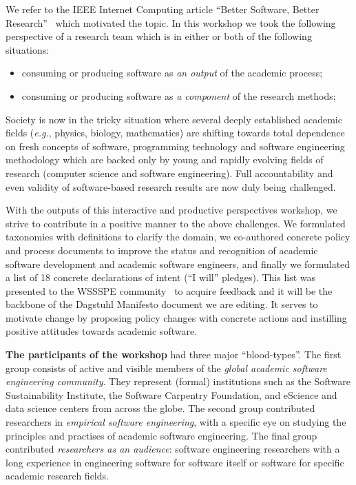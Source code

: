 \documentclass[a4paper,UKenglish]{dagrep}
\newcommand{\eg}{\emph{e.g.},\xspace}
\begin{document}
We refer to the IEEE Internet Computing article ``Better Software, Better Research''~\cite{Goble2014} which motivated the topic. In this workshop we took the following perspective of a research team which is in either or both of the following situations:
\begin{itemize}
\item consuming or producing software as \emph{an output} of the academic process;
\item consuming or producing software as \emph{a component} of the research methods;
\end{itemize}

Society is now in the tricky situation where several deeply established academic fields
(\eg physics, biology, mathematics) are shifting towards total dependence on fresh concepts of software, programming technology and software engineering methodology
which are backed only by young and rapidly evolving fields of research (computer science and software engineering).  Full accountability and even validity of software-based research results are now duly being challenged.

With the outputs of this interactive and productive perspectives workshop, we strive to contribute in a positive manner to the above challenges. We formulated taxonomies with definitions to clarify the domain, we co-authored concrete policy and process documents to improve the status and recognition of academic software development and academic software engineers, and finally we formulated a list of 18 concrete declarations of intent (``I will'' pledges). This list was presented to the WSSSPE community~\cite{wssspe_manifesto} to acquire feedback and it will be the backbone of the Dagstuhl Manifesto document we are editing. It serves to motivate change by  proposing policy changes with concrete actions and instilling positive attitudes towards academic software.


\textbf{The participants of the workshop} had three major ``blood-types''. The first group consists of active and visible members of the \emph{global academic software engineering community}. They represent (formal) institutions such as the Software Sustainability Institute, the Software Carpentry Foundation, and eScience and data science centers from across the globe. The second group contributed researchers in \emph{empirical software engineering}, with a specific eye on studying the principles and practises of academic software engineering. The final group contributed \emph{researchers as an audience}: software engineering researchers with a long experience in engineering software for software itself or software for specific academic research fields.
\end{document}
